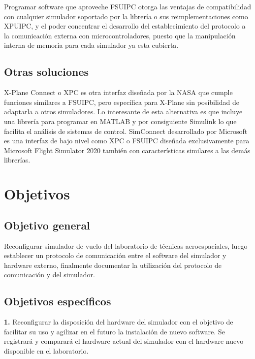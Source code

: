 Programar software que aproveche FSUIPC otorga las ventajas de compatibilidad con cualquier simulador soportado por la librería o sus reimplementaciones como XPUIPC, y el poder concentrar el desarrollo del establecimiento del protocolo a la comunicación externa con microcontroladores, puesto que la manipulación interna de memoria para cada simulador ya esta cubierta.

\subsection{Otras soluciones}

X-Plane Connect \cite{xpc} o XPC es otra interfaz diseñada por la NASA que cumple funciones similares a FSUIPC, pero específica para X-Plane sin posibilidad de adaptarla a otros simuladores. Lo interesante de esta alternativa es que incluye una librería para programar en MATLAB \cite{matlab} y por consiguiente Simulink \cite{simulink} lo que facilita el análisis de sistemas de control. SimConnect \cite{simconnect} desarrollado por Microsoft es una interfaz de bajo nivel como XPC o FSUIPC diseñada exclusivamente para Microsoft Flight Simulator 2020 también con características similares a las demás librerías.

\section{Objetivos}

\subsection{Objetivo general}

Reconfigurar simulador de vuelo del laboratorio de técnicas aeroespaciales, luego establecer un protocolo de comunicación entre el software del simulador y hardware externo, finalmente documentar la utilización del protocolo de comunicación y del simulador.

\subsection {Objetivos específicos}

\textbf{1.} Reconfigurar la disposición del hardware del simulador con el objetivo de facilitar su uso y agilizar en el futuro la instalación de nuevo software. Se registrará y comparará el hardware actual del simulador con el hardware nuevo disponible en el laboratorio.


